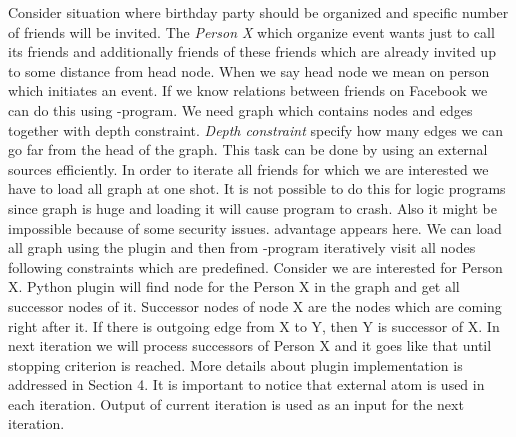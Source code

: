 \documentclass[14pt,a4paper, titlepage]{article}
\begin{document}
Consider situation where birthday party should be organized and specific number of friends will
 be invited. The \emph{Person X} which organize event wants just to call its friends and additionally
  friends of these friends which are already invited up to some distance from head node. When we say head 
  node we mean on person which initiates an event. If we know relations between friends on Facebook 
  we can do this using \hex{}-program. We need graph which contains nodes and edges together with depth 
  constraint. \emph{Depth constraint} specify how many edges we can go far from  the head of the graph. 
  This task can be done by using an external sources efficiently. In order to iterate all friends for 
  which we are interested we have to load all graph at one shot. It is not possible to do this for logic 
  programs since graph is huge and loading it will cause program to crash. Also it might be impossible because 
  of some security issues. \dlvhex{} advantage appears here. We can load all graph using the plugin and 
  then from \hex{}-program iteratively visit all nodes following constraints which are predefined. 
  Consider we are interested for Person X. Python plugin will find node for the Person X in the graph 
  and get all successor nodes of it. Successor nodes of node X are the nodes which are coming right after it. 
  If there is outgoing edge from X to Y, then Y is successor of X. In next iteration we will process successors 
  of Person X and it goes like that until stopping criterion is reached. More details about plugin implementation 
  is addressed in Section 4. It is important to notice that external atom is used in each iteration. Output of 
  current iteration is used as an input for the next iteration. 
               
\end{document}
